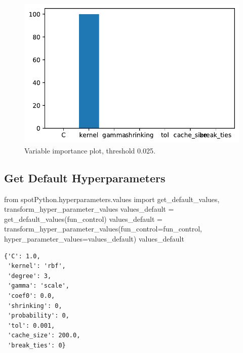 \documentclass[
  letterpaper,
  DIV=11,
  numbers=noendperiod]{scrreprt}
\newenvironment{Shaded}{\begin{snugshade}}{\end{snugshade}}
\newcommand{\ImportTok}[1]{\textcolor[rgb]{0.00,0.46,0.62}{#1}}
\newcommand{\NormalTok}[1]{\textcolor[rgb]{0.00,0.23,0.31}{#1}}
\newcommand{\OperatorTok}[1]{\textcolor[rgb]{0.37,0.37,0.37}{#1}}
\begin{document}
\begin{figure}[H]

{\centering \includegraphics{017_spot_hpt_sklearn_classification_files/figure-pdf/cell-24-output-1.pdf}

}

\caption{Variable importance plot, threshold 0.025.}

\end{figure}

\hypertarget{get-default-hyperparameters}{%
\subsection{Get Default
Hyperparameters}\label{get-default-hyperparameters}}

\begin{Shaded}
\begin{Highlighting}[]
\ImportTok{from}\NormalTok{ spotPython.hyperparameters.values }\ImportTok{import}\NormalTok{ get\_default\_values, transform\_hyper\_parameter\_values}
\NormalTok{values\_default }\OperatorTok{=}\NormalTok{ get\_default\_values(fun\_control)}
\NormalTok{values\_default }\OperatorTok{=}\NormalTok{ transform\_hyper\_parameter\_values(fun\_control}\OperatorTok{=}\NormalTok{fun\_control, hyper\_parameter\_values}\OperatorTok{=}\NormalTok{values\_default)}
\NormalTok{values\_default}
\end{Highlighting}
\end{Shaded}

\begin{verbatim}
{'C': 1.0,
 'kernel': 'rbf',
 'degree': 3,
 'gamma': 'scale',
 'coef0': 0.0,
 'shrinking': 0,
 'probability': 0,
 'tol': 0.001,
 'cache_size': 200.0,
 'break_ties': 0}
\end{verbatim}
\end{document}
